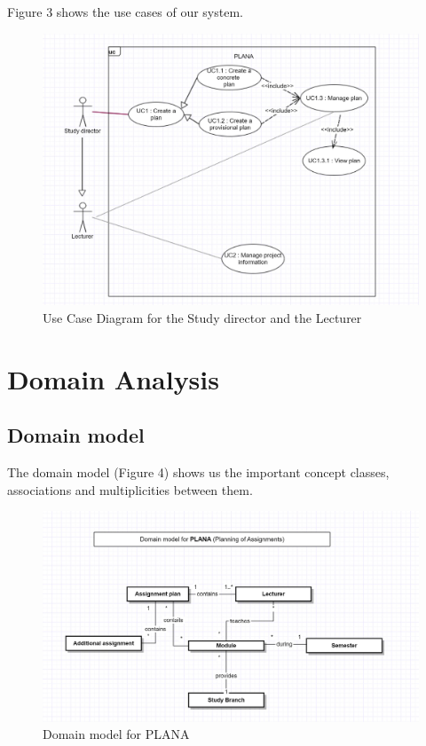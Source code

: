 \documentclass{scrartcl}
\begin{document}
  	Figure 3 shows the use cases of our system.
  	  	\begin{figure}[H]
\centering
\includegraphics[width=150mm]{uml/ucd_last_last.JPG}
\caption{Use Case Diagram for the Study director and the Lecturer }
\label{ucd_study director&lecturer}
\end{figure}
    
    
  \pagebreak
  	
\section{Domain Analysis} 	 
    \subsection{Domain model}  
 The domain model (Figure 4) shows us the important concept classes, associations and multiplicities between them.
    \begin{figure}[H]
\centering
\includegraphics[width=150mm]{uml/domain3}
\caption{Domain model for  PLANA}
\label{Domain model  1st verstion}
\end{figure} 
\end{document}
